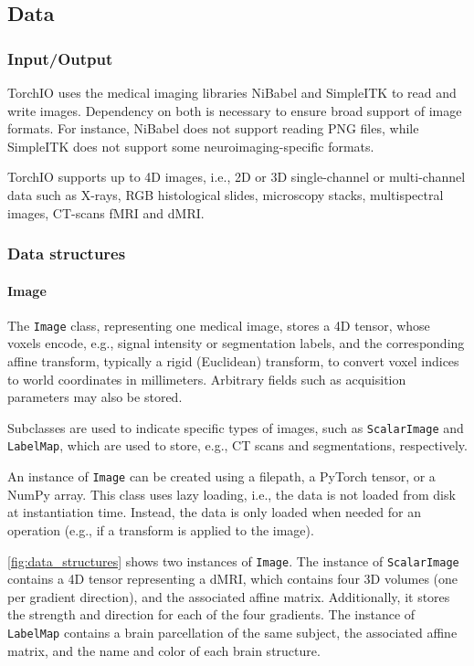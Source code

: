 \subsection{Data}

\subsubsection{Input/Output}

TorchIO uses the medical imaging libraries NiBabel and SimpleITK to read and write images.
Dependency on both is necessary to ensure broad support of image formats.
For instance, NiBabel does not support reading \ac{PNG} files, while SimpleITK does not support some neuroimaging-specific formats.

TorchIO supports up to 4D images, i.e., 2D or 3D single-channel or multi-channel data such as X-rays, \ac{RGB} histological slides, microscopy stacks, multispectral images, \ac{CT}-scans \ac{fMRI} and \ac{dMRI}.


\subsubsection{Data structures}
\label{sec:data_structures}

\paragraph{Image}

The \texttt{Image} class, representing one medical image, stores a 4D tensor, whose voxels encode, e.g., signal intensity or segmentation labels, and the corresponding affine transform, typically a rigid (Euclidean) transform, to convert voxel indices to world coordinates in millimeters.
Arbitrary fields such as acquisition parameters may also be stored.

Subclasses are used to indicate specific types of images, such as \texttt{ScalarImage} and \texttt{LabelMap}, which are used to store, e.g., \ac{CT} scans and segmentations, respectively.

An instance of \texttt{Image} can be created using a filepath, a PyTorch tensor, or a NumPy array.
This class uses lazy loading, i.e., the data is not loaded from disk at instantiation time.
Instead, the data is only loaded when needed for an operation (e.g., if a transform is applied to the image).

\cref{fig:data_structures} shows two instances of \texttt{Image}.
The instance of \texttt{ScalarImage} contains a 4D tensor representing a \ac{dMRI}, which contains four 3D volumes (one per gradient direction), and the associated affine matrix.
Additionally, it stores the strength and direction for each of the four gradients.
The instance of \texttt{LabelMap} contains a brain parcellation of the same subject, the associated affine matrix, and the name and color of each brain structure.

